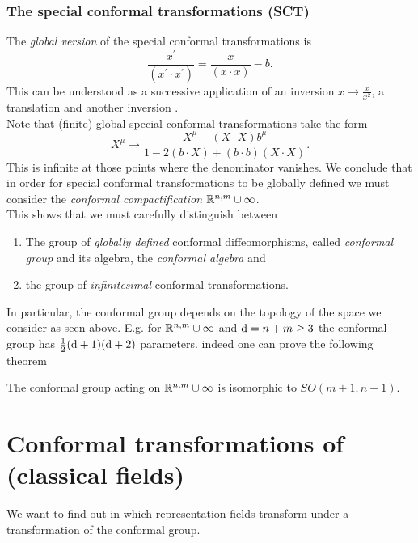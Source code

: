 \subsubsection{The special conformal transformations (SCT)}
The \emph{global version} of the special conformal transformations is
\begin{equation}
	\frac{x^\prime}{(x^\prime \cdot x^\prime)} = \frac{x}{(x \cdot x)} - b.
\end{equation}
This can be understood as a successive application of an inversion $x\rightarrow \frac{x}{x^2}$, a translation and another inversion .\\
Note that (finite) global special conformal transformations take the form
\begin{equation}
	X^\mu \rightarrow \frac{X^\mu - (X\cdot X) b^\mu}{1-2(b\cdot X) + (b\cdot b) (X\cdot X)}.
\end{equation}
This is infinite at those points where the denominator vanishes. We conclude that in order for special conformal transformations to be globally defined we must consider the \emph{conformal compactification} $\mathbb{R}^{n,m}\cup \infty$. \\
This shows that we must carefully distinguish between
\begin{enumerate}
	\item The group of \emph{globally defined} conformal diffeomorphisms, called \emph{conformal group} and its algebra, the \emph{conformal algebra} and
	\item the group of \emph{infinitesimal} conformal transformations.
\end{enumerate}
In particular, the conformal group depends on the topology of the space we consider as seen above. E.g. for $\mathbb{R}^{n,m} \cup \infty$ and $\mathrm{d} =n+m \geq 3$ the conformal group has $\frac{1}{2} (\mathrm{d}+1)(\mathrm{d}+2)$ parameters. indeed one can prove the following theorem
\begin{mybox}{}
The conformal group acting on $\mathbb{R}^{n,m} \cup \infty$ is isomorphic to $SO(m+1,n+1)$.
\end{mybox}

\section{Conformal transformations of (classical fields)}
We want to find out in which representation fields transform under a transformation of the conformal group.
